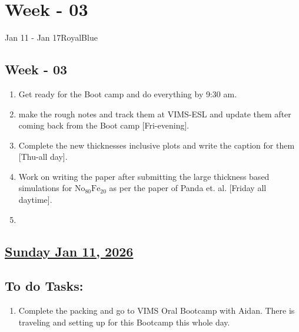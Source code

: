 \section{Week - 03}
\begin{physicsmodule}{Jan 11 - Jan 17}{RoyalBlue}
  \begin{lawbox}
    \subsection*{\sffamily\bfseries Week - 03}
    \begin{enumerate}
    \item Get ready for the Boot camp and do everything by 9:30 am. \cmark 
    \item make the rough notes and track them at VIMS-ESL and update them after coming back from the Boot camp [Fri-evening].
    \item Complete the new thicknesses inclusive plots and write the caption for them [Thu-all day].
    \item Work on writing the paper after submitting the large thickness based simulations for $\mathrm{No_{80}Fe_{20}}$ as per the paper of Panda et. al. \cite{pandaUltrafastDemagnetizationPrecession2023} [Friday all daytime].
    \item 
\end{enumerate}
  \end{lawbox}
\end{physicsmodule}
\subsection*{\underline{Sunday Jan 11, 2026}}
\subsection*{To do Tasks:}
\begin{enumerate}
    \item Complete the packing and go to VIMS Oral Bootcamp with Aidan. There is traveling and setting up for this Bootcamp this whole day. \cmark
\end{enumerate}
